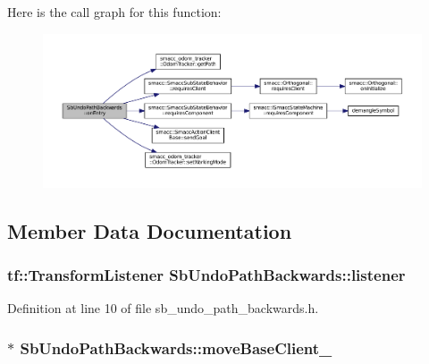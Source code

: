 Here is the call graph for this function\+:
\nopagebreak
\begin{figure}[H]
\begin{center}
\leavevmode
\includegraphics[width=350pt]{classSbUndoPathBackwards_ab7eed4fa4633235b877758bd787bbea1_cgraph}
\end{center}
\end{figure}




\subsection{Member Data Documentation}
\subsubsection[{\texorpdfstring{listener}{listener}}]{\setlength{\rightskip}{0pt plus 5cm}tf\+::\+Transform\+Listener Sb\+Undo\+Path\+Backwards\+::listener\hspace{0.3cm}{\ttfamily [private]}}\hypertarget{classSbUndoPathBackwards_ad341922358ca111e8bea86a2f94a1f5c}{}\label{classSbUndoPathBackwards_ad341922358ca111e8bea86a2f94a1f5c}


Definition at line 10 of file sb\+\_\+undo\+\_\+path\+\_\+backwards.\+h.

\subsubsection[{\texorpdfstring{move\+Base\+Client\+\_\+}{moveBaseClient_}}]{$\ast$ Sb\+Undo\+Path\+Backwards\+::move\+Base\+Client\+\_\+\hspace{0.3cm}{\ttfamily [private]}}\hypertarget{classSbUndoPathBackwards_ad201bd8837a54bd7df0efc8d72fdb151}{}\label{classSbUndoPathBackwards_ad201bd8837a54bd7df0efc8d72fdb151}


